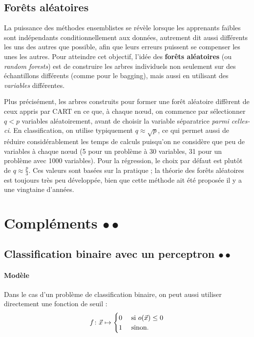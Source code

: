\subsection{Forêts aléatoires}
La puissance des méthodes ensemblistes se révèle lorsque les apprenants faibles
sont indépendants conditionnellement aux données, autrement dit aussi
différents les uns des autres que possible, afin que leurs erreurs puissent se
compenser les unes les autres. Pour atteindre cet objectif, l'idée des
\textbf{forêts aléatoires} (ou \textit{random forests}) est de construire les
arbres individuels non seulement sur des échantillons différents (comme pour le
bagging), mais aussi en utilisant des {\it variables} différentes.

Plus précisément, les arbres construits pour former une forêt aléatoire
diffèrent de ceux appris par CART en ce que, à chaque n{\oe}ud, on commence par
sélectionner $q < p$ variables aléatoirement, avant de choisir la variable
séparatrice {\it parmi celles-ci}. En classification, on utilise typiquement
$q \approx \sqrt{p}$, ce qui permet aussi de réduire considérablement les temps
de calculs puisqu'on ne considère que peu de variables à chaque n{\oe}ud (5
pour un problème à 30 variables, 31 pour un problème avec 1000 variables). Pour
la régression, le choix par défaut est plutôt de $q \approx \frac{p}3.$ Ces
valeurs sont basées sur la pratique ; la théorie des forêts aléatoires est
toujours très peu développée, bien que cette méthode ait été proposée il y a
une vingtaine d'années.


\section{Compléments $\bullet \bullet$}

\subsection{Classification binaire avec un perceptron $\bullet \bullet$}
\label{sec:perceptron_binary}
\paragraph{Modèle}
Dans le cas d'un problème de classification binaire, on peut aussi utiliser
directement une fonction de seuil :
\begin{equation}
  \label{eq:seuil}
  f\colon \xx \mapsto 
  \begin{cases}
    0 & \text{ si } o(\xx) \leq 0 \\
    1 & \text{ sinon.}
  \end{cases}
\end{equation}

